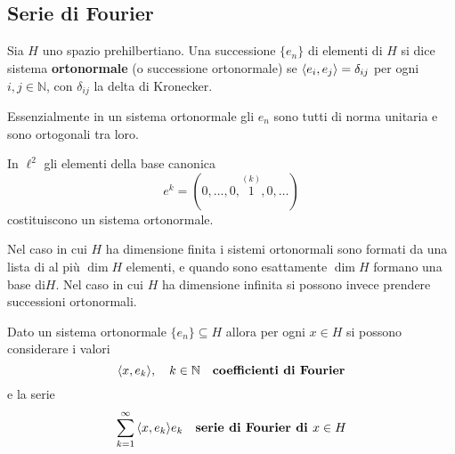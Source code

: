\subsection{Serie di Fourier}
\begin{definition}
    Sia \(H\) uno spazio prehilbertiano. Una successione \(\{e_{n}\} \) di
    elementi di \(H\) si dice sistema \textbf{ortonormale} (o successione
    ortonormale) se \({\left\langle e_{i}, e_{j}\right\rangle} = \delta_{ij}\) per ogni \(i, j \in
    \mathbb{N}\), con \(\delta_{ij}\) la delta di Kronecker.
\end{definition}
Essenzialmente in un sistema ortonormale gli \(e_{n}\) sono tutti di norma
unitaria e sono ortogonali tra loro.
\begin{example}
    In \(\ell^2\) gli elementi della base canonica 
    \[
        e^{k} = (0, \ldots, 0, \overset{(k)}{1}, 0, \ldots)
    \]
    costituiscono un sistema ortonormale.
\end{example}
\begin{remark}
    Nel caso in cui \(H\) ha dimensione finita i sistemi ortonormali 
    sono formati da una lista di al più  \(\dim H\) elementi, e quando sono esattamente
    \(\dim H\) formano una base di\(H\). Nel caso in cui \(H\) ha
    dimensione infinita si possono invece prendere successioni ortonormali.
\end{remark}
\begin{definition}\label{def:fourier}
    Dato un sistema ortonormale \(\{e_{n}\} \subseteq H \) allora per ogni \(x
    \in H\) si possono considerare i valori \[{\left\langle x, e_{k}\right\rangle}, \quad k \in
    \mathbb{N}\quad \text{\textbf{coefficienti di Fourier}}\] e la serie
    \[
      \sum_{k=1}^{\infty} {\left\langle x, e_{k}\right\rangle} e_{k} \quad \text{\textbf{serie di
      Fourier di }} x \in H
    \]
\end{definition}

